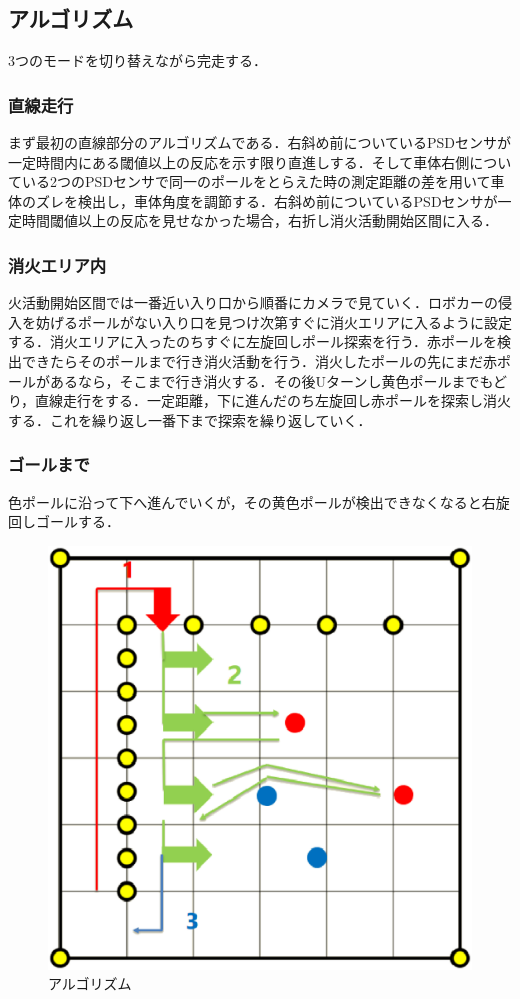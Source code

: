 \documentclass[10pt,a4j]{jarticle}
\begin{document}
\newpage

\subsection{アルゴリズム}
3つのモードを切り替えながら完走する．
 \subsubsection{直線走行}
 まず最初の直線部分のアルゴリズムである．右斜め前についているPSDセンサが一定時間内にある閾値以上の反応を示す限り直進しする．そして車体右側についている2つのPSDセンサで同一のポールをとらえた時の測定距離の差を用いて車体のズレを検出し，車体角度を調節する．右斜め前についているPSDセンサが一定時間閾値以上の反応を見せなかった場合，右折し消火活動開始区間に入る．
 \subsubsection{消火エリア内}
火活動開始区間では一番近い入り口から順番にカメラで見ていく．ロボカーの侵入を妨げるポールがない入り口を見つけ次第すぐに消火エリアに入るように設定する．消火エリアに入ったのちすぐに左旋回しポール探索を行う．赤ポールを検出できたらそのポールまで行き消火活動を行う．消火したポールの先にまだ赤ポールがあるなら，そこまで行き消火する．その後Uターンし黄色ポールまでもどり，直線走行をする．一定距離，下に進んだのち左旋回し赤ポールを探索し消火する．これを繰り返し一番下まで探索を繰り返していく．
 \subsubsection{ゴールまで} 
色ポールに沿って下へ進んでいくが，その黄色ポールが検出できなくなると右旋回しゴールする．


\begin{figure}[hb]
\begin{center}
  \includegraphics[scale = 0.4]{./picture/screen_shot.eps}
 \caption{アルゴリズム}
\end{center}
\end{figure}
\end{document}
